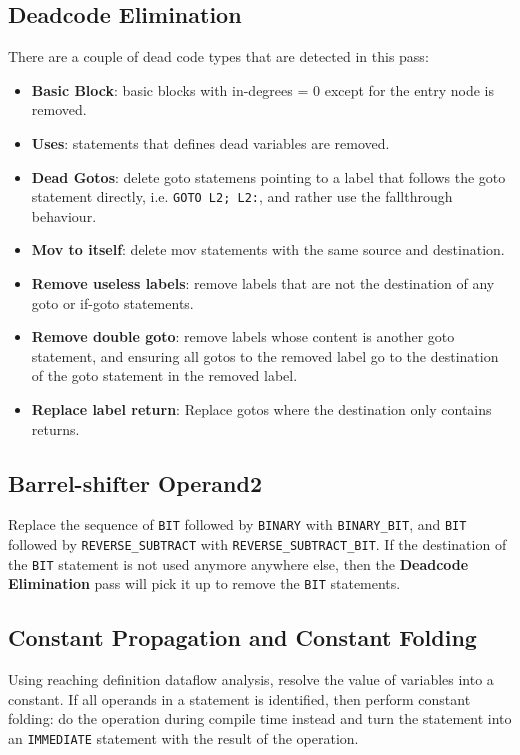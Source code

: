 \documentclass[nonacm, acmsmall, screen, 10pt]{acmart}
\begin{document}
\subsection{Deadcode Elimination}
There are a couple of dead code types that are detected in this pass:
\begin{itemize}
  \item \textbf{Basic Block}: basic blocks with in-degrees = 0 except for the entry node is removed.
  \item \textbf{Uses}: statements that defines dead variables are removed.
  \item \textbf{Dead Gotos}: delete goto statemens pointing to a label that follows the goto statement directly, i.e. \texttt{GOTO L2; L2:}, and rather use the fallthrough behaviour.
  \item \textbf{Mov to itself}: delete mov statements with the same source and destination.
  \item \textbf{Remove useless labels}: remove labels that are not the destination of any goto or if-goto statements.
  \item \textbf{Remove double goto}: remove labels whose content is another goto statement, and ensuring all gotos to the removed label go to the destination of the goto statement in the removed label.
  \item \textbf{Replace label return}: Replace gotos where the destination only contains returns.
\end{itemize}

\subsection{Barrel-shifter Operand2}
Replace the sequence of \texttt{BIT} followed by \texttt{BINARY} with \texttt{BINARY\_BIT}, and \texttt{BIT} followed by \texttt{REVERSE\_SUBTRACT} with \texttt{REVERSE\_SUBTRACT\_BIT}.
If the destination of the \texttt{BIT} statement is not used anymore anywhere else, then the \textbf{Deadcode Elimination} pass will pick it up to remove the \texttt{BIT} statements.

\subsection{Constant Propagation and Constant Folding}
Using reaching definition dataflow analysis, resolve the value of variables into a constant.
If all operands in a statement is identified, then perform constant folding: do the operation during compile time instead and turn the statement into an \texttt{IMMEDIATE} statement with the result of the operation.
\end{document}
